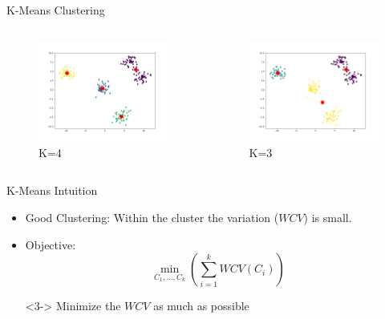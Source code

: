 \documentclass{beamer}
\begin{document}
\begin{frame}{K-Means Clustering}
\begin{columns}[T]
  \begin{column}{0.5\textwidth}
    \begin{figure}
      \includegraphics[width=.8\textwidth]{unsupervised/k_ex_4.png}
      \vspace*{-0.3cm}
      \caption{K=4}
    \end{figure}
  \end{column}
  \begin{column}{0.5\textwidth}
    \begin{figure}
      \includegraphics[width=.8\textwidth]{unsupervised/k_ex_3.png}
      \vspace*{-0.3cm}
      \caption{K=3}
    \end{figure}
  \end{column}
\end{columns}
\end{frame}

\begin{frame}{K-Means Intuition}
\begin{itemize}
\item<1-> Good Clustering: Within the cluster the variation ($WCV$) is small.
\item<2-> Objective: $$ \min_{C_1,\ldots , C_k} \left( \sum_{i=1}^{k} WCV \left(C_i\right) \right) $$
\item[]<3-> Minimize the $WCV$ as much as possible
\end{itemize}
\end{frame}
\end{document}
